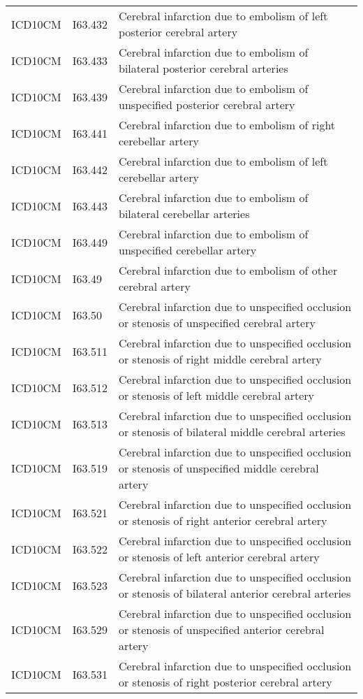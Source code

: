 \begin{longtable}{p{}p{}p{}}
  ICD10CM & I63.432 & Cerebral infarction due to embolism of left posterior cerebral artery \\ 
  ICD10CM & I63.433 & Cerebral infarction due to embolism of bilateral posterior cerebral arteries \\ 
  ICD10CM & I63.439 & Cerebral infarction due to embolism of unspecified posterior cerebral artery \\ 
  ICD10CM & I63.441 & Cerebral infarction due to embolism of right cerebellar artery \\ 
  ICD10CM & I63.442 & Cerebral infarction due to embolism of left cerebellar artery \\ 
  ICD10CM & I63.443 & Cerebral infarction due to embolism of bilateral cerebellar arteries \\ 
  ICD10CM & I63.449 & Cerebral infarction due to embolism of unspecified cerebellar artery \\ 
  ICD10CM & I63.49 & Cerebral infarction due to embolism of other cerebral artery \\ 
  ICD10CM & I63.50 & Cerebral infarction due to unspecified occlusion or stenosis of unspecified cerebral artery \\ 
  ICD10CM & I63.511 & Cerebral infarction due to unspecified occlusion or stenosis of right middle cerebral artery \\ 
  ICD10CM & I63.512 & Cerebral infarction due to unspecified occlusion or stenosis of left middle cerebral artery \\ 
  ICD10CM & I63.513 & Cerebral infarction due to unspecified occlusion or stenosis of bilateral middle cerebral arteries \\ 
  ICD10CM & I63.519 & Cerebral infarction due to unspecified occlusion or stenosis of unspecified middle cerebral artery \\ 
  ICD10CM & I63.521 & Cerebral infarction due to unspecified occlusion or stenosis of right anterior cerebral artery \\ 
  ICD10CM & I63.522 & Cerebral infarction due to unspecified occlusion or stenosis of left anterior cerebral artery \\ 
  ICD10CM & I63.523 & Cerebral infarction due to unspecified occlusion or stenosis of bilateral anterior cerebral arteries \\ 
  ICD10CM & I63.529 & Cerebral infarction due to unspecified occlusion or stenosis of unspecified anterior cerebral artery \\ 
  ICD10CM & I63.531 & Cerebral infarction due to unspecified occlusion or stenosis of right posterior cerebral artery \\ 

\end{longtable}
